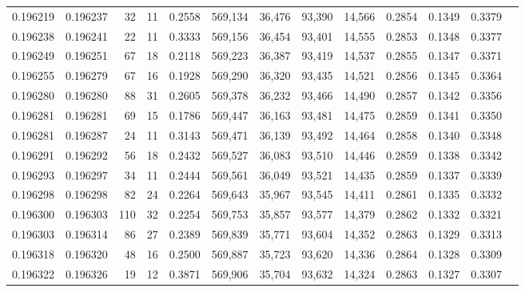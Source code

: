 \begin{tabular}{rrrrrrrrrrrrr}
0.196219 & 0.196237 &    32 &  11 &                                     0.2558 & 569,134 &  36,476 &  93,390 &  14,566 & 0.2854 & 0.1349 & 0.3379 \\
0.196238 & 0.196241 &    22 &  11 &                                     0.3333 & 569,156 &  36,454 &  93,401 &  14,555 & 0.2853 & 0.1348 & 0.3377 \\
0.196249 & 0.196251 &    67 &  18 &                                     0.2118 & 569,223 &  36,387 &  93,419 &  14,537 & 0.2855 & 0.1347 & 0.3371 \\
0.196255 & 0.196279 &    67 &  16 &                                     0.1928 & 569,290 &  36,320 &  93,435 &  14,521 & 0.2856 & 0.1345 & 0.3364 \\
0.196280 & 0.196280 &    88 &  31 &                                     0.2605 & 569,378 &  36,232 &  93,466 &  14,490 & 0.2857 & 0.1342 & 0.3356 \\
0.196281 & 0.196281 &    69 &  15 &                                     0.1786 & 569,447 &  36,163 &  93,481 &  14,475 & 0.2859 & 0.1341 & 0.3350 \\
0.196281 & 0.196287 &    24 &  11 &                                     0.3143 & 569,471 &  36,139 &  93,492 &  14,464 & 0.2858 & 0.1340 & 0.3348 \\
0.196291 & 0.196292 &    56 &  18 &                                     0.2432 & 569,527 &  36,083 &  93,510 &  14,446 & 0.2859 & 0.1338 & 0.3342 \\
0.196293 & 0.196297 &    34 &  11 &                                     0.2444 & 569,561 &  36,049 &  93,521 &  14,435 & 0.2859 & 0.1337 & 0.3339 \\
0.196298 & 0.196298 &    82 &  24 &                                     0.2264 & 569,643 &  35,967 &  93,545 &  14,411 & 0.2861 & 0.1335 & 0.3332 \\
0.196300 & 0.196303 &   110 &  32 &                                     0.2254 & 569,753 &  35,857 &  93,577 &  14,379 & 0.2862 & 0.1332 & 0.3321 \\
0.196303 & 0.196314 &    86 &  27 &                                     0.2389 & 569,839 &  35,771 &  93,604 &  14,352 & 0.2863 & 0.1329 & 0.3313 \\
0.196318 & 0.196320 &    48 &  16 &                                     0.2500 & 569,887 &  35,723 &  93,620 &  14,336 & 0.2864 & 0.1328 & 0.3309 \\
0.196322 & 0.196326 &    19 &  12 &                                     0.3871 & 569,906 &  35,704 &  93,632 &  14,324 & 0.2863 & 0.1327 & 0.3307 \\

\end{tabular}
